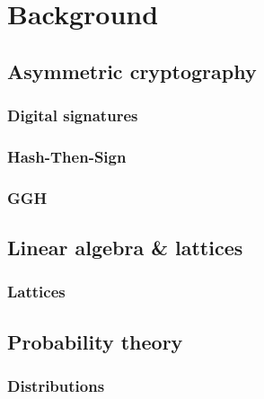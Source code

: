 \chapter{Background}

\section{Asymmetric cryptography}

\subsection{Digital signatures}
\subsection{Hash-Then-Sign}
\subsection{GGH}

\section{Linear algebra \& lattices}
\subsection{Lattices}

\section{Probability theory}
\subsection{Distributions}


